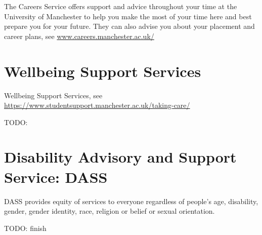 \documentclass[
]{book}
\begin{document}
The Careers Service offers support and advice throughout your time at the University of Manchester to help you make the most of your time here and best prepare you for your future. They can also advise you about your placement and career plans, see \href{https://www.careers.manchester.ac.uk/}{www.careers.manchester.ac.uk/}

\section{Wellbeing Support Services}\label{wellbeing}

Wellbeing Support Services, see \url{https://www.studentsupport.manchester.ac.uk/taking-care/} \citep{wellbeing}

TODO:

\section{Disability Advisory and Support Service: DASS}\label{dass}

DASS provides equity of services to everyone regardless of people's age, disability, gender, gender
identity, race, religion or belief or sexual orientation.

TODO: finish

  
\end{document}
